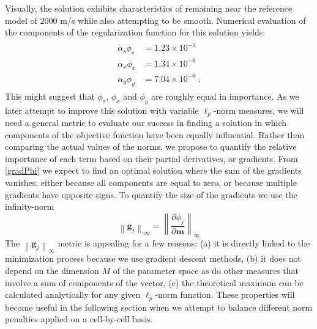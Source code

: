 \documentclass[extra,referee]{gji}
\begin{document}
Visually, the solution exhibits characteristics of remaining near the reference model  of $2000$ m/s  while also attempting to be smooth.
Numerical evaluation of the components of the regularization function for this solution yields:
\begin{align*}
\begin{split}
\alpha_s \phi_s &= 1.23 \times 10^{-5}\\
\alpha_x \phi_x &= 1.34 \times 10^{-6}\\
\alpha_y \phi_y &= 7.04 \times 10^{-6}\;.
\end{split}
\end{align*}
This might suggest that $\phi_s$, $\phi_x$ and $\phi_y$ are roughly equal in importance.
As we later attempt to improve this solution with variable $\ell_p$-norm measures, we will need a general metric to evaluate our success in finding a solution in which components of the objective function have been equally influential.
Rather than comparing the actual values of the norms, we propose to quantify the relative
importance of each term based on their partial derivatives, or gradients. From \eqref{gradPhi} we expect to find an optimal solution where the sum of the gradients vanishes, either because all components are equal to zero, or because multiple gradients have opposite signs. To quantify the size of the gradients we use the infinity-norm
\begin{equation}
\left\| \mathbf{g}_j \right\|_\infty = \left\| \frac{\partial \phi_j}{\partial \mathbf{m}} \right\|_\infty
\end{equation}
The $\left\|\mathbf{g}_j \right\|_\infty$ metric is appealing for a few reasons: (a) it is directly linked to the minimization process because we use gradient descent methods, (b) it does not depend on the dimension $M$ of the parameter space as do other measures that involve a sum of components of the vector, (c) the theoretical maximum can be calculated analytically for any given $\ell_p$-norm function. These properties will become useful in the following section when we attempt to balance different norm penalties applied on a cell-by-cell basis.
\end{document}
